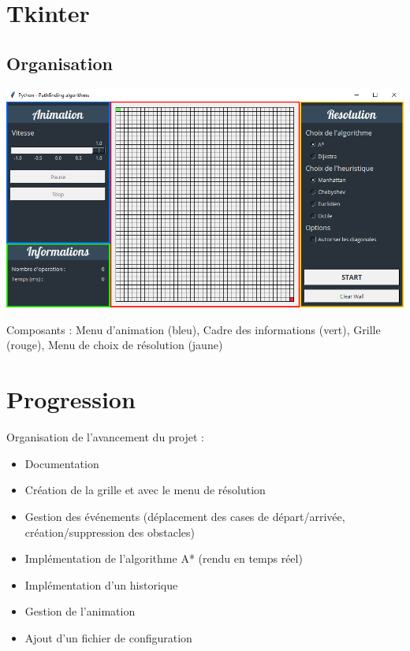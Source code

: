 \documentclass[11pt]{beamer}
\begin{document}
\section{Tkinter}
	\subsection{Organisation}
		\begin{frame}
			\begin{center}
				\includegraphics[scale=0.3]{images/UI.jpg}
			\end{center}
			Composants : Menu d'animation (bleu), Cadre des informations (vert), Grille (rouge), Menu de choix de résolution (jaune)		
		\end{frame}

\section{Progression}
	\begin{frame}
		Organisation de l'avancement du projet :
		\begin{itemize}
			\item Documentation
			\item Création de la grille et avec le menu de résolution
			\item Gestion des événements (déplacement des cases de départ/arrivée, création/suppression des obstacles)
			\item Implémentation de l'algorithme A* (rendu en temps réel)
			\item Implémentation d'un historique
			\item Gestion de l'animation
			\item Ajout d'un fichier de configuration
		\end{itemize}
	\end{frame}
\end{document}
